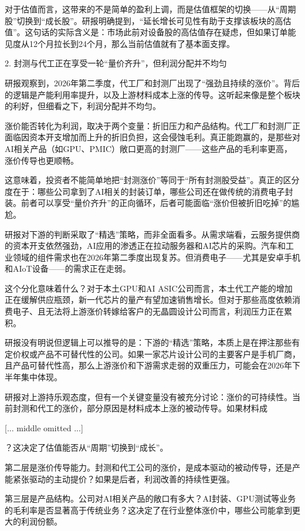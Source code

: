 \documentclass[11pt]{ctexart}
\begin{document}
对于估值而言，这带来的不是简单的盈利上调，而是估值框架的切换——从“周期股”切换到“成长股”。研报明确提到，“延长增长可见性有助于支撑该板块的高估值”。这句话的实际含义是：市场此前对设备股的高估值存在疑虑，但如果订单能见度从12个月拉长到24个月，那么当前估值就有了基本面支撑。

2. 封测与代工正在享受一轮“量价齐升”，但利润分配并不均匀

研报观察到，2026年第二季度，代工厂和封测厂出现了“强劲且持续的涨价”。背后的逻辑是产能利用率提升，以及上游材料成本上涨的传导。这听起来像是整个板块的利好，但细看之下，利润分配并不均匀。

涨价能否转化为利润，取决于两个变量：折旧压力和产品结构。代工厂和封测厂正面临因资本开支增加而上升的折旧负担，这会侵蚀毛利。真正能跑赢的，是那些对AI相关产品（如GPU、PMIC）敞口更高的封测厂——这些产品的毛利率更高，涨价传导也更顺畅。

这意味着，投资者不能简单地把“封测涨价”等同于“所有封测股受益”。真正的区分度在于：哪些公司拿到了AI相关的封装订单，哪些公司还在做传统的消费电子封装。前者可以享受“量价齐升”的正向循环，后者可能面临“涨价但被折旧吃掉”的尴尬。

研报对下游的判断采取了“精选”策略，而非全面看多。从需求端看，云服务提供商的资本开支依然强劲，AI应用的渗透正在拉动服务器和AI芯片的采购。汽车和工业领域的组件需求也在2026年第二季度出现复苏。但消费电子——尤其是安卓手机和AIoT设备——的需求正在走弱。

这个分化意味着什么？对于本土GPU和AI ASIC公司而言，本土代工产能的增加正在缓解供应瓶颈，新一代芯片的量产有望加速销售增长。但对于那些高度依赖消费电子、且无法将上游涨价转嫁给客户的无晶圆设计公司而言，利润压力正在累积。

研报没有明说但逻辑上可以推导的是：下游的“精选”策略，本质上是在押注那些有定价权或产品不可替代性的公司。如果一家芯片设计公司的主要客户是手机厂商，且产品可替代性高，那么上游涨价和下游需求走弱的双重压力，可能会在2026年下半年集中体现。

研报对上游持乐观态度，但有一个关键变量没有被充分讨论：涨价的可持续性。当前封测和代工的涨价，部分原因是材料成本上涨的被动传导。如果材料成

[... middle omitted ...]

？这决定了估值能否从“周期”切换到“成长”。

第二层是涨价传导能力。封测和代工公司的涨价，是成本驱动的被动传导，还是产能紧张驱动的主动提价？如果是后者，利润改善的持续性更强。

第三层是产品结构。公司对AI相关产品的敞口有多大？AI封装、GPU测试等业务的毛利率是否显著高于传统业务？这决定了在行业整体涨价中，哪些公司能拿到更大的利润份额。
\end{document}
